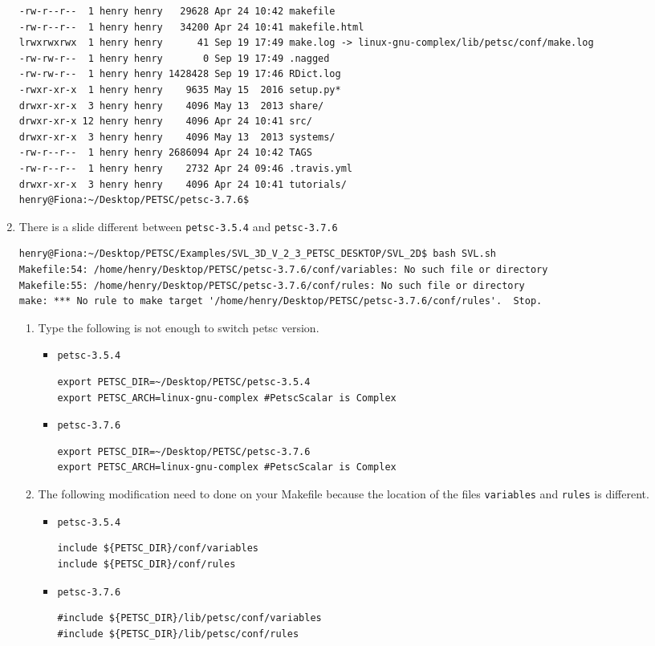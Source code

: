 \documentclass{article}
\begin{document}
\begin{enumerate}
\begin{verbatim}
-rw-r--r--  1 henry henry   29628 Apr 24 10:42 makefile
-rw-r--r--  1 henry henry   34200 Apr 24 10:41 makefile.html
lrwxrwxrwx  1 henry henry      41 Sep 19 17:49 make.log -> linux-gnu-complex/lib/petsc/conf/make.log
-rw-rw-r--  1 henry henry       0 Sep 19 17:49 .nagged
-rw-rw-r--  1 henry henry 1428428 Sep 19 17:46 RDict.log
-rwxr-xr-x  1 henry henry    9635 May 15  2016 setup.py*
drwxr-xr-x  3 henry henry    4096 May 13  2013 share/
drwxr-xr-x 12 henry henry    4096 Apr 24 10:41 src/
drwxr-xr-x  3 henry henry    4096 May 13  2013 systems/
-rw-r--r--  1 henry henry 2686094 Apr 24 10:42 TAGS
-rw-r--r--  1 henry henry    2732 Apr 24 09:46 .travis.yml
drwxr-xr-x  3 henry henry    4096 Apr 24 10:41 tutorials/
henry@Fiona:~/Desktop/PETSC/petsc-3.7.6$
\end{verbatim}
\normalsize
\item There is a slide different between \verb+petsc-3.5.4+ and \verb+petsc-3.7.6+
\tiny
\begin{verbatim}
henry@Fiona:~/Desktop/PETSC/Examples/SVL_3D_V_2_3_PETSC_DESKTOP/SVL_2D$ bash SVL.sh
Makefile:54: /home/henry/Desktop/PETSC/petsc-3.7.6/conf/variables: No such file or directory
Makefile:55: /home/henry/Desktop/PETSC/petsc-3.7.6/conf/rules: No such file or directory
make: *** No rule to make target '/home/henry/Desktop/PETSC/petsc-3.7.6/conf/rules'.  Stop.
\end{verbatim}
\normalsize
\begin{enumerate}
\item Type the following is not enough to switch petsc version. 
\begin{itemize}
\item \verb+petsc-3.5.4+
\tiny
\begin{verbatim}
export PETSC_DIR=~/Desktop/PETSC/petsc-3.5.4
export PETSC_ARCH=linux-gnu-complex #PetscScalar is Complex
\end{verbatim}
\normalsize
\item \verb+petsc-3.7.6+
\tiny
\begin{verbatim}
export PETSC_DIR=~/Desktop/PETSC/petsc-3.7.6
export PETSC_ARCH=linux-gnu-complex #PetscScalar is Complex
\end{verbatim}
\normalsize
\end{itemize}
\item The following modification need to done on  your Makefile because the location of the files \verb+variables+ and \verb+rules+ is different.
\begin{itemize}
\item \verb+petsc-3.5.4+
\tiny
\begin{verbatim}
include ${PETSC_DIR}/conf/variables
include ${PETSC_DIR}/conf/rules
\end{verbatim}
\normalsize
\item \verb+petsc-3.7.6+
\tiny
\begin{verbatim}
#include ${PETSC_DIR}/lib/petsc/conf/variables
#include ${PETSC_DIR}/lib/petsc/conf/rules
\end{verbatim}
\normalsize
\end{itemize}
\end{enumerate}
\tiny
\begin{verbatim}


\end{verbatim}
\end{enumerate}
\end{document}
